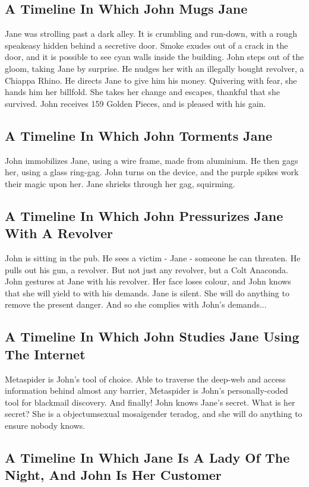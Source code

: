 \documentclass{article}
\begin{document}
\subsection{A Timeline In Which John Mugs Jane}


Jane was strolling past a dark alley.
It is crumbling and run{-}down, with a rough speakeasy hidden behind a secretive door.
Smoke exudes out of a crack in the door, and it is possible to see cyan walls inside the building.
John steps out of the gloom, taking Jane by surprise.
He nudges her with an illegally bought revolver, a Chiappa Rhino.
He directs Jane to give him his money.
Quivering with fear, she hands him her billfold.
She takes her change and escapes, thankful that she survived.
John receives 159 Golden Pieces, and is pleased with his gain.
\subsection{A Timeline In Which John Torments Jane}


John immobilizes Jane, using a wire frame, made from aluminium.
He then gags her, using a glass ring{-}gag.
John turns on the device, and the purple spikes work their magic upon her.
Jane shrieks through her gag, squirming.
\subsection{A Timeline In Which John Pressurizes Jane With A Revolver}


John is sitting in the pub.
He sees a victim {-} Jane {-} someone he can threaten. He pulls out his gun, a revolver.
But not just any revolver, but a Colt Anaconda.
John gestures at Jane with his revolver. Her face loses colour, and John knows that she will yield to with his demands.
Jane is silent. She will do anything to remove the present danger. And so she complies with John's demands...
\subsection{A Timeline In Which John Studies Jane Using The Internet}


Metaspider is John's tool of choice. Able to traverse the deep{-}web and access information behind almost any barrier, Metaspider is John's personally{-}coded tool for blackmail discovery.
And finally!
John knows Jane's secret. What is her secret? She is a objectumsexual mosaigender teradog, and she will do anything to ensure nobody knows.
\subsection{A Timeline In Which Jane Is A Lady Of The Night, And John Is Her Customer}
\end{document}
